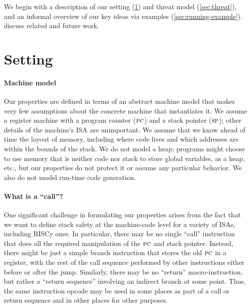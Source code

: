 \documentclass[acmsmall,review,anonymous]{acmart}\settopmatter{printfolios=true,printccs=false,printacmref=false}
\newcommand*{\rsp}{\textsc{sp}}
\begin{document}
We begin with a description of our setting (\cref{sec:setup}) and threat
model (\cref{sec:threat}), and an informal overview of our key ideas via
examples (\cref{sec:running-example}).  discuss related and future work.

\section{Setting}
\label{sec:setup}

\paragraph*{Machine model}
Our properties are defined in terms of an abstract machine model that makes very few
assumptions about the concrete machine that instantiates it.  We assume a register
machine with a program counter (\(\textsc{pc}\)) and a stack pointer (\(\rsp\)); other
details of the machine's ISA are unimportant. We assume that we know ahead of time
the layout of memory, including where code lives and which addresses are within
the bounds of the stack. We do not model a heap; programs might choose to use memory
that is neither code nor stack to store global variables, as a heap, etc., but our
properties do not protect it or assume any particular behavior. We also do not
model run-time code generation.



\paragraph*{What is a ``call''?}  One significant challenge in formulating our
properties arises from the fact that we want to define stack safety at the
machine-code level for a variety of ISAs, including RISCy
\ifaftersubmission{}\fi ones.  In
particular, there may be no single ``call'' instruction that does all the
required manipulation of the \(\textsc{pc}\) and stack pointer. Instead, there
might be just a simple branch instruction that stores the old \(\textsc{pc}\) in
a register, with the rest of the call sequence performed by other
instructions either before or after the jump.  Similarly, there may be no
``return'' macro-instruction, but rather a ``return sequence'' involving an
indirect branch at some point.  Thus, the same instruction opcode may be
used in some places as part of a call or return sequence and in other places
for other purposes.
\end{document}
